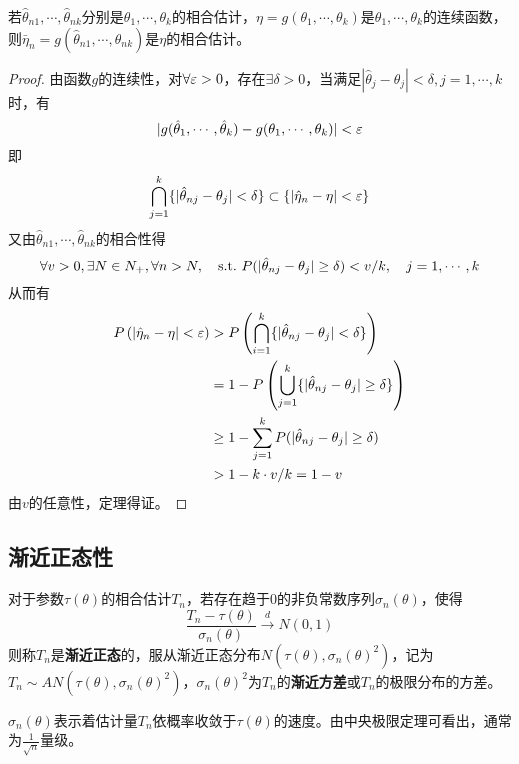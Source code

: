 \begin{theorem}[相合估计的连续映射]
    若$\hat{\theta}_{n1},\cdots,\hat{\theta}_{nk}$分别是$\theta_1,\cdots,\theta_k$的相合估计，$\eta=g(\theta_1,\cdots,\theta_k)$是$\theta_1,\cdots,\theta_k$的连续函数，则$\bar{\eta}_n=g(\hat{\theta}_{n1},\cdots,\hat{\theta}_{nk})$是$\eta$的相合估计。
\end{theorem}
\begin{proof}
    由函数$g$的连续性，对$\forall \varepsilon>0$，存在$\exists \delta>0$，当满足$|\hat{\theta}_j-\theta_j|<\delta,j=1,\cdots,k$时，有
    \[ |g(\hat{\theta}_1, \cdots, \hat{\theta}_{k})-g(\theta_1, \cdots, \theta_{k})|<\varepsilon \]
    即
    \[ \bigcap_{j=1}^k \{|\hat{\theta}_{n j}-\theta_j| < \delta\} \subset \{ | \hat\eta_n - \eta | < \varepsilon \} \]
    又由$\hat{\theta}_{n1},\cdots,\hat{\theta}_{nk}$的相合性得
    \[ \forall v>0 ,\exists N \in N_+, \forall n>N ,\quad \mathrm{s.t.}\  P(|\hat{\theta}_{n j}-\theta_{j}| \ge \delta)<v/k, \quad j=1, \cdots, k\]
    从而有
    \begin{align*}
        P\left(\left|\hat{\eta}_n -\eta\right|<\varepsilon\right) & >
        P\left(\bigcap_{i=1}^k\{|\hat{\theta}_{n j} - \theta_j|<\delta\}\right)                                                              \\
                                                         & = 1-P\left(\bigcup_{j=1}^k\{ | \hat{\theta}_{n j}-\theta_j | \ge \delta\}\right) \\
                                                         & \ge 1-\sum_{j=1}^k P(|\hat{\theta}_{n j}-\theta_j| \ge \delta)                  \\
                                                         & >1 - k \cdot v/k = 1-v
    \end{align*}
    由$v$的任意性，定理得证。
\end{proof}

\subsection{渐近正态性}

\begin{definition}[渐近正态性]
    对于参数$\tau(\theta)$的相合估计$T_n$，若存在趋于$0$的非负常数序列$\sigma_n(\theta)$，使得
    \[ \frac{T_n - \tau(\theta)}{\sigma_n(\theta)} \xrightarrow{d} N(0,1) \]
    则称$T_n$是\textbf{渐近正态}的，服从渐近正态分布$N(\tau(\theta),\sigma_n(\theta)^2)$，记为$T_n \sim AN(\tau(\theta),\sigma_n(\theta)^2)$，$\sigma_n(\theta)^2$为$T_n$的\textbf{渐近方差}或$T_n$的极限分布的方差。
\end{definition}
\begin{remark}
    $\sigma_n(\theta)$表示着估计量$T_n$依概率收敛于$\tau(\theta)$的速度。由中央极限定理可看出，通常为$\frac1{\sqrt{n} }$量级。
\end{remark}

